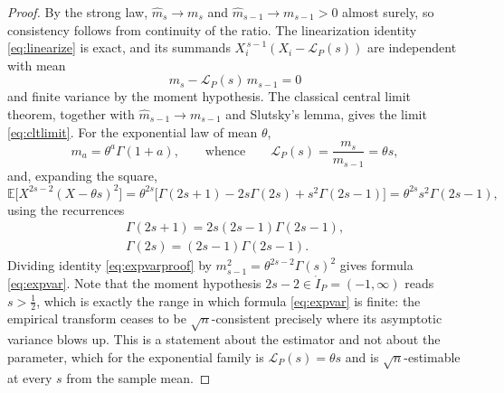\documentclass[sn-mathphys-num]{sn-jnl}
\theoremstyle{thmstyleone}%
\theoremstyle{thmstyletwo}%
\theoremstyle{thmstylethree}%
\theoremstyle{thmstyleone}%
\providecommand{\E}{\mathbb{E}}
\providecommand{\Leh}{\mathscr{L}}
\begin{document}
\begin{appendices}
		\begin{proof}
			By the strong law, $\widehat m_s\to m_s$ and
			$\widehat m_{s-1}\to m_{s-1}>0$ almost surely, so consistency
			follows from continuity of the ratio. The linearization
			identity \eqref{eq:linearize} is exact, and its summands
			$X_i^{\,s-1}(X_i-\Leh_P(s))$ are independent with mean
			\begin{equation}\label{eq:cltmeanzero}
				m_s-\Leh_P(s)\,m_{s-1}=0
			\end{equation}
			and finite variance by the moment hypothesis. The classical
			central limit theorem, together with
			$\widehat m_{s-1}\to m_{s-1}$ and Slutsky's lemma, gives the limit
			\eqref{eq:cltlimit}. For the exponential law of mean $\theta$,
			\begin{equation}\label{eq:expmoments}
				m_a=\theta^{a}\Gamma(1+a),
				\qquad\text{whence}\qquad
				\Leh_P(s)=\frac{m_s}{m_{s-1}}=\theta s ,
			\end{equation}
			and, expanding the square,
			\begin{equation}\label{eq:expvarproof}
				\E\bigl[X^{2s-2}(X-\theta s)^{2}\bigr]
				=\theta^{2s}\bigl[\Gamma(2s+1)-2s\Gamma(2s)+s^2\Gamma(2s-1)\bigr]
				=\theta^{2s}s^{2}\Gamma(2s-1),
			\end{equation}
			using the recurrences
			\begin{equation}\label{eq:gammarecs}
				\begin{gathered}
					\Gamma(2s+1)=2s(2s-1)\Gamma(2s-1),\\
					\Gamma(2s)=(2s-1)\Gamma(2s-1).
				\end{gathered}
			\end{equation}
			Dividing
			identity \eqref{eq:expvarproof} by $m_{s-1}^{2}=\theta^{2s-2}\Gamma(s)^{2}$
			gives formula \eqref{eq:expvar}. Note that the moment hypothesis
			$2s-2\in\mathring I_P=(-1,\infty)$ reads $s>\tfrac12$, which is
			exactly the range in which formula \eqref{eq:expvar} is finite:
			the empirical transform ceases to be $\sqrt n$-consistent
			precisely where its asymptotic variance blows up. This is a
			statement about the estimator and not about the parameter,
			which for the exponential family is $\Leh_P(s)=\theta s$ and is
			$\sqrt n$-estimable at every $s$ from the sample mean.
		\end{proof}
		
		\propbias*
		

\end{appendices}
\end{document}
